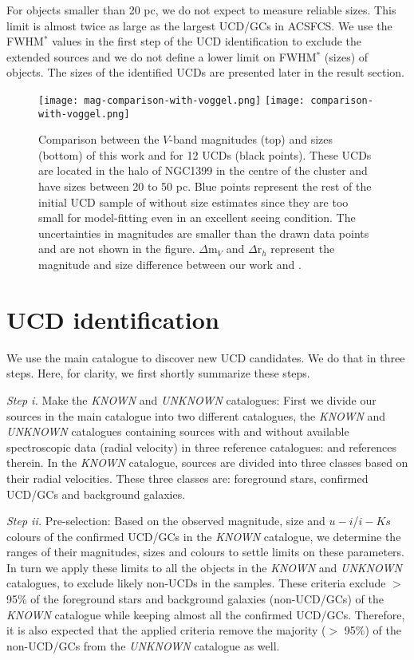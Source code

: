 \documentclass[fleqn,usenatbib]{mnras}
\begin{document}
For objects smaller than 20 pc, we do not expect to measure reliable sizes. This limit is almost twice as large as the largest UCD/GCs in ACSFCS. We use the FWHM$^*$ values in the first step of the UCD identification to exclude the extended sources and we do not define a lower limit on FWHM$^*$ (sizes) of objects. The sizes of the identified UCDs are presented later in the result section.

\begin{figure}
        \texttt{[image: mag-comparison-with-voggel.png]}
        \texttt{[image: comparison-with-voggel.png]}
\caption{Comparison between the $V$-band magnitudes (top) and sizes (bottom) of this work and \citet{voggel-2016} for 12 UCDs (black points). These UCDs are located in the halo of NGC1399 in the centre of the cluster and have sizes between 20 to 50 pc. Blue points represent the rest of the initial UCD sample of \citet{voggel-2016} without size estimates since they are too small for model-fitting even in an excellent seeing condition. The uncertainties in magnitudes are smaller than the drawn data points and are not shown in the figure. $\Delta$m$_V$  and $\Delta$r$_h$ represent the magnitude and size difference between our work and \citet{voggel-2016}.}
\label{size}
\end{figure}

\section{UCD identification}
\label{sec4}
We use the main catalogue to discover new UCD candidates. We do that in three steps. Here, for clarity,  we first shortly summarize these steps.

\textit{Step i.} Make the \textit{KNOWN} and \textit{UNKNOWN} catalogues: First we divide our sources in the main catalogue into two different catalogues, the \textit{KNOWN} and \textit{UNKNOWN} catalogues containing sources with and without available spectroscopic data (radial velocity) in three reference catalogues: \citet{wittmann-2016,Pota-2018,Maddox-2019} and references therein. In the \textit{KNOWN} catalogue, sources are divided into three classes based on their radial velocities. These three classes are: foreground stars, confirmed UCD/GCs and background galaxies.

\textit{Step ii.} Pre-selection: Based on the observed magnitude, size and $u-i$/$i-Ks$ colours of the confirmed UCD/GCs in the \textit{KNOWN} catalogue, we determine the ranges of their magnitudes, sizes and colours to settle limits on these parameters. In turn  we apply these limits to all the objects in the \textit{KNOWN} and \textit{UNKNOWN} catalogues, to exclude likely non-UCDs in the samples. These criteria exclude $>$ 95\% of the foreground stars and background galaxies (non-UCD/GCs) of the \textit{KNOWN} catalogue while keeping almost all the confirmed UCD/GCs. Therefore, it is also expected that the applied criteria remove the majority ($>$ 95\%) of the non-UCD/GCs from the \textit{UNKNOWN} catalogue as well.
\end{document}
